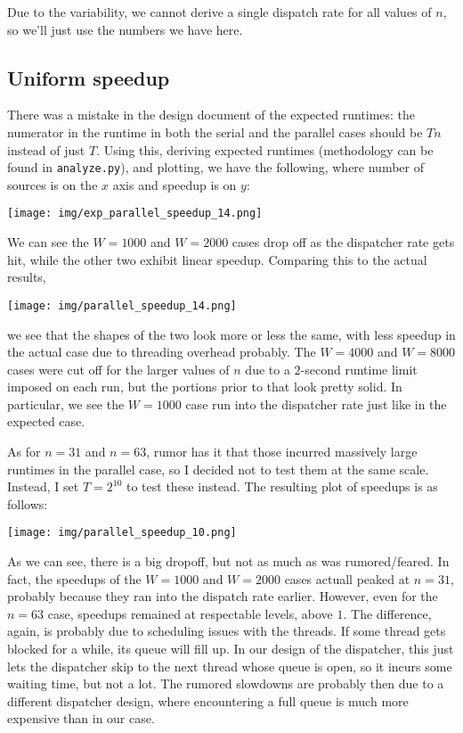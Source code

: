\documentclass{article}
\begin{document}
Due to the variability, we cannot derive a single dispatch rate for all values of $n$, so we'll just use the numbers we have here.
\subsection*{Uniform speedup}
There was a mistake in the design document of the expected runtimes: the numerator in the runtime in both the serial and the parallel  cases should be $Tn$ instead of just $T$. Using this, deriving expected runtimes (methodology can be found in \verb|analyze.py|), and plotting, we have the following, where number of sources is on the $x$ axis and speedup is on $y$:

\texttt{[image: img/exp\_parallel\_speedup\_14.png]}

We can see the $W=1000$ and $W=2000$ cases drop off as the dispatcher rate gets hit, while the other two exhibit linear speedup. Comparing this to the actual results, 

\texttt{[image: img/parallel\_speedup\_14.png]}

we see that the shapes of the two look more or less the same, with less speedup in the actual case due to threading overhead probably. The $W=4000$ and $W=8000$ cases were cut off for the larger values of $n$ due to a $2$-second runtime limit imposed on each run, but the portions prior to that look pretty solid. In particular, we see the $W=1000$ case run into the dispatcher rate just like in the expected case. 

As for $n=31$ and $n=63$, rumor has it that those incurred massively large runtimes in the parallel case, so I decided not to test them at the same scale. Instead, I set $T=2^{10}$ to test these instead. The resulting plot of speedups is as follows:

\texttt{[image: img/parallel\_speedup\_10.png]}

As we can see, there is a big dropoff, but not as much as was rumored/feared. In fact, the speedups of the $W=1000$ and $W=2000$ cases actuall peaked at $n=31$, probably because they ran into the dispatch rate earlier. However, even for the $n=63$ case, speedups remained at respectable levels, above $1$. The difference, again, is probably due to scheduling issues with the threads. If some thread gets blocked for a while, its queue will fill up. In our design of the dispatcher, this just lets the dispatcher skip to the next thread whose queue is open, so it incurs some waiting time, but not a lot. The rumored slowdowns are probably then due to a different dispatcher design, where encountering a full queue is much more expensive than in our case.
\end{document}

